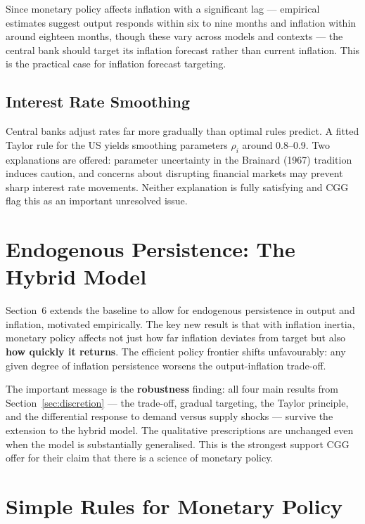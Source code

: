 \documentclass[11pt, a4paper]{article}
\begin{document}
Since monetary policy affects inflation with a significant lag --- empirical
estimates suggest output responds within six to nine months and inflation
within around eighteen months, though these vary across models and contexts
--- the central bank should target its inflation forecast rather than current
inflation. This is the practical case for inflation forecast targeting.

\subsection*{Interest Rate Smoothing}

Central banks adjust rates far more gradually than optimal rules predict. A
fitted Taylor rule for the US yields smoothing parameters $\rho_i$ around
0.8--0.9. Two explanations are offered: parameter uncertainty in the Brainard
(1967) tradition induces caution, and concerns about disrupting financial
markets may prevent sharp interest rate movements. Neither explanation is
fully satisfying and CGG flag this as an important unresolved issue.

\section{Endogenous Persistence: The Hybrid Model}

Section~6 extends the baseline to allow for endogenous persistence in output
and inflation, motivated empirically. The key new result is that with
inflation inertia, monetary policy affects not just how far inflation deviates
from target but also \textbf{how quickly it returns}. The efficient policy
frontier shifts unfavourably: any given degree of inflation persistence
worsens the output-inflation trade-off.

The important message is the \textbf{robustness} finding: all four main
results from Section~\ref{sec:discretion} --- the trade-off, gradual
targeting, the Taylor principle, and the differential response to demand
versus supply shocks --- survive the extension to the hybrid model. The
qualitative prescriptions are unchanged even when the model is substantially
generalised. This is the strongest support CGG offer for their claim that
there is a science of monetary policy.

\section{Simple Rules for Monetary Policy}
\label{sec:simple_rules}
\end{document}
